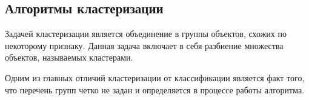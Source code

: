 %
%
%
%
%
%
%

\subsection{Алгоритмы кластеризации}
Задачей кластеризации является объединение в группы объектов, схожих по некоторому признаку. Данная задача включает в себя разбиение множества объектов, называемых кластерами. \cite{clasters}

Одним из главных отличий кластеризации от классификации является факт того, что перечень групп четко не задан и определяется в процессе работы алгоритма. \cite{clasters}

